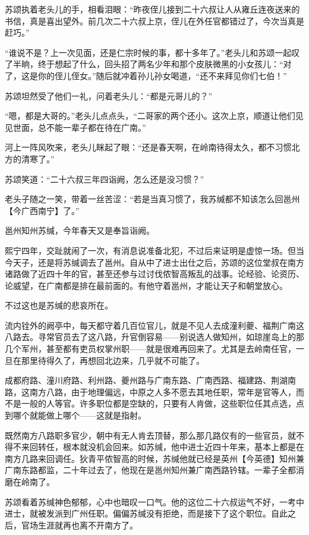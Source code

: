 苏颂执着老头儿的手，相看泪眼：“昨夜侄儿接到二十六叔让人从雍丘连夜送来的书信，真是喜出望外。前几次二十六叔上京，侄儿在外任官都错过了，今次当真是赶巧。”

“谁说不是？上一次见面，还是仁宗时候的事，都十多年了。”老头儿和苏颂一起叹了半晌，终于想起了什么，回头招了两名少年和那个皮肤微黑的小女孩儿：“对了，这是你的侄儿侄女。”随后就冲着孙儿孙女喝道，“还不来拜见你们七伯！”

苏颂坦然受了他们一礼，问着老头儿：“都是元哥儿的？”

“嗯，都是大哥的。”老头儿点点头，“二哥家的两个还小。这次上京，顺道让他们见见世面，总不能一辈子都在待在广南。”

河上一阵风吹来，老头儿眯起了眼：“还是春天啊，在岭南待得太久，都不习惯北方的清寒了。”

苏颂笑道：“二十六叔三年四诣阙，怎么还是没习惯？”

老头子随之一笑，带着一丝苦涩：“若是当真习惯了，我苏缄都不知该怎么回邕州【今广西南宁】了。”

邕州知州苏缄，今年春天又是奉旨诣阙。

熙宁四年，交趾就闹了一次，有消息说准备北犯，不过后来证明是虚惊一场。但当今天子，还是将苏缄调去了邕州。自从中了进士出仕之后，苏颂的这位堂叔在南方诸路做了近四十年的官，甚至还参与过讨伐侬智高叛乱的战事。论经验、论资历、论威望，在广南都是排在最前面的。有他守着邕州，才能让天子和朝堂放心。

不过这也是苏缄的悲哀所在。

流内铨外的阙亭中，每天都守着几百位官儿，就是不见人去成潼利夔、福荆广南这八路去。寻常官员去了这八路，升官倒容易——别说选人做知州，如琼崖岛上的那几个军州，甚至都有吏员权掌州职——就是很难再回来了。尤其是去岭南任官，一旦在那里待得久了，再想回北边来，几乎就不可能了。

成都府路、潼川府路、利州路、夔州路与广南东路、广南西路、福建路、荆湖南路，这南方八路，由于地理偏远，中原之人多不愿去其地任职，常年是官等人，而不是一般的人等官。许多职位都是空缺的，只要有人肯做，这些职位任其点选，点到哪个就能做上哪个——这就是指射。

既然南方八路职多官少，朝中有无人肯去顶替，那么那几路仅有的一些官员，就不得不来回转任，根本就没机会回来。如苏缄，他中进士近四十年来，基本上都是在南方几路来回调任。狄青平侬智高的时候，苏缄他就已经是英州【今英德】知州兼广南东路都监，二十年过去了，他现在是邕州知州兼广南西路钤辖。一辈子全都消磨在岭南了。

苏颂看着苏缄神色郁郁，心中也暗叹一口气。他的这位二十六叔运气不好，一考中进士，就被发派到广州任职。偏偏苏缄没有拒绝，而是接下了这个职位。自此之后，官场生涯就再也离不开南方了。

